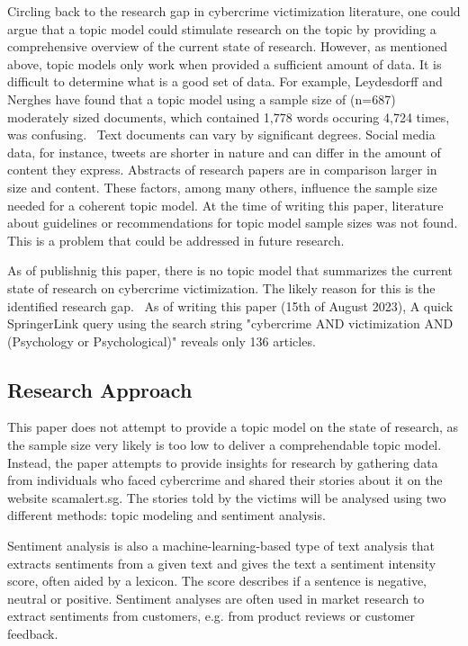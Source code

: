 Circling back to the research gap in cybercrime victimization literature, one could argue that a topic model could stimulate research on the topic by providing a comprehensive overview of the current state of research. However, as mentioned above, topic models only work when provided a sufficient amount of data. It is difficult to determine what is a good set of data. For example, Leydesdorff and Nerghes have found that a topic model using a sample size of (n=687) moderately sized documents, which contained 1,778 words occuring 4,724 times, was confusing.~\citep{leydesdorff2017co} Text documents can vary by significant degrees. Social media data, for instance, tweets are shorter in nature and can differ in the amount of content they express. Abstracts of research papers are in comparison larger in size and content. These factors, among many others, influence the sample size needed for a coherent topic model. At the time of writing this paper, literature about guidelines or recommendations for topic model sample sizes was not found. This is a problem that could be addressed in future research.

\bigskip

As of publishnig this paper, there is no topic model that summarizes the current state of research on cybercrime victimization. The likely reason for this is the identified research gap.~\citep{horesearch} As of writing this paper (15th of August 2023), A quick SpringerLink query using the search string "cybercrime AND victimization AND (Psychology or Psychological)" reveals only 136 articles.

\subsection*{Research Approach}

This paper does not attempt to provide a topic model on the state of research, as the sample size very likely is too low to deliver a comprehendable topic model.
Instead, the paper attempts to provide insights for research by gathering data from individuals who faced cybercrime and shared their stories about it on the website scamalert.sg. The stories told by the victims will be analysed using two different methods: topic modeling and sentiment analysis.

Sentiment analysis is also a machine-learning-based type of text analysis that extracts sentiments from a given text and gives the text a sentiment intensity score, often aided by a lexicon. The score describes if a sentence is negative, neutral or positive. Sentiment analyses are often used in market research to extract sentiments from customers, e.g. from product reviews or customer feedback.~\cite{rambocas2013marketing}

